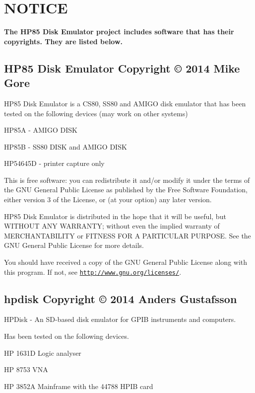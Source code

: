 \hypertarget{index_COPYRIGHT}{}\section{N\-O\-T\-I\-C\-E}\label{index_COPYRIGHT}
{\bfseries The H\-P85 Disk Emulator project includes software that has their copyrights. They are listed below.}





\subsection*{H\-P85 Disk Emulator Copyright \copyright{} 2014 Mike Gore}

H\-P85 Disk Emulator is a C\-S80, S\-S80 and A\-M\-I\-G\-O disk emulator that has been tested on the following devices (may work on other systems)
\begin{DoxyItemize}
\item H\-P85\-A -\/ A\-M\-I\-G\-O D\-I\-S\-K
\item H\-P85\-B -\/ S\-S80 D\-I\-S\-K and A\-M\-I\-G\-O D\-I\-S\-K
\item H\-P54645\-D -\/ printer capture only
\end{DoxyItemize}

This is free software\-: you can redistribute it and/or modify it under the terms of the G\-N\-U General Public License as published by the Free Software Foundation, either version 3 of the License, or (at your option) any later version.

H\-P85 Disk Emulator is distributed in the hope that it will be useful, but W\-I\-T\-H\-O\-U\-T A\-N\-Y W\-A\-R\-R\-A\-N\-T\-Y; without even the implied warranty of M\-E\-R\-C\-H\-A\-N\-T\-A\-B\-I\-L\-I\-T\-Y or F\-I\-T\-N\-E\-S\-S F\-O\-R A P\-A\-R\-T\-I\-C\-U\-L\-A\-R P\-U\-R\-P\-O\-S\-E. See the G\-N\-U General Public License for more details.

You should have received a copy of the G\-N\-U General Public License along with this program. If not, see \href{http://www.gnu.org/licenses/}{\tt http\-://www.\-gnu.\-org/licenses/}.





\subsection*{hpdisk Copyright \copyright{} 2014 Anders Gustafsson}

H\-P\-Disk -\/ An S\-D-\/based disk emulator for G\-P\-I\-B instruments and computers.\par
 Has been tested on the following devices.
\begin{DoxyItemize}
\item H\-P 1631\-D Logic analyser
\item H\-P 8753 V\-N\-A
\item H\-P 3852\-A Mainframe with the 44788 H\-P\-I\-B card
\end{DoxyItemize}

